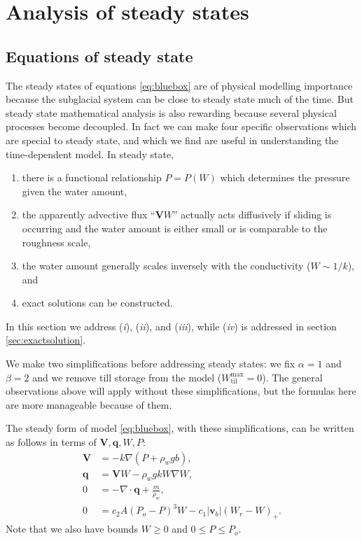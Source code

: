 \documentclass[gmd]{copernicus}   %
\newcommand{\text}{\textrm}
\newcommand\bv{\mathbf{v}}
\newcommand\bV{\mathbf{V}}
\newcommand\bq{\mathbf{q}}
\newcommand{\Div}{\nabla\cdot}
\newcommand{\grad}{\nabla}
\newcommand{\Wtilmax}{W_{\text{til}}^{\text{max}}}
\begin{document}
\section{Analysis of steady states}  \label{sec:steady}

\subsection{Equations of steady state}  The steady states of equations \eqref{eq:bluebox} are of physical modelling importance because the subglacial system can be close to steady state much of the time.  But steady state mathematical analysis is also rewarding because several physical processes become decoupled.  In fact we can make four specific observations which are special to steady state, and which we find are useful in understanding the time-dependent model.  In steady state,
\renewcommand{\labelenumi}{(\emph{\roman{enumi}})}
\begin{enumerate}
\item there is a functional relationship $P=P(W)$ which determines the pressure given the water amount,
\item the apparently advective flux ``$\bV W$'' actually acts diffusively if sliding is occurring and the water amount is either small or is comparable to the roughness scale,
\item the water amount generally scales inversely with the conductivity ($W \sim 1/k$), and
\item exact solutions can be constructed.
\end{enumerate}
In this section we address (\emph{i}), (\emph{ii}), and (\emph{iii}), while (\emph{iv}) is addressed in section \ref{sec:exactsolution}.

We make two simplifications before addressing steady states: we fix $\alpha=1$ and $\beta=2$ and we remove till storage from the model ($\Wtilmax=0$).  The general observations above will apply without these simplifications, but the formulas here are more manageable because of them.

The steady form of model \eqref{eq:bluebox}, with these simplifications, can be written as follows in terms of $\bV,\bq,W,P$:
\begin{align}
\bV &= - k \grad \left(P + \rho_w g b\right), \label{eq:Vsteady} \\
\bq &= \bV W - \rho_w g k W \grad W, \label{eq:qsteady} \\
0 &= - \Div \bq + \frac{m}{\rho_w}, \label{eq:masscontsteady} \\
0 &= c_2 A (P_o - P)^3 W - c_1 |\bv_b| (W_r - W)_+. \label{eq:openclosesteady}
\end{align}
Note that we also have bounds $W\ge 0$ and $0 \le P \le P_o$.
\end{document}
